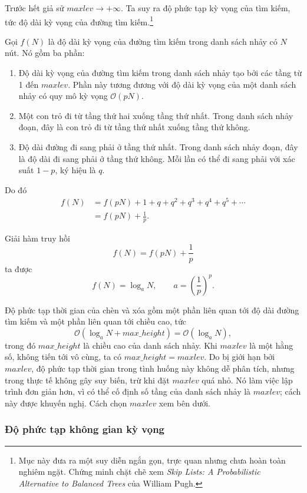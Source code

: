 \documentclass[11pt]{article}
\newcommand{\Oh}{\mathcal{O}}
\newcommand{\maxlev}{\mathit{maxlev}}
\begin{document}
Trước hết giả sử $\maxlev\to+\infty$. Ta suy ra độ phức tạp kỳ vọng của tìm
kiếm, tức độ dài kỳ vọng của đường tìm kiếm.\footnote{Mục này đưa ra một suy
diễn ngắn gọn, trực quan nhưng chưa hoàn toàn nghiêm ngặt. Chứng minh chặt chẽ
xem \textit{Skip Lists: A Probabilistic Alternative to Balanced Trees} của
William Pugh.}

Gọi $f(N)$ là độ dài kỳ vọng của đường tìm kiếm trong danh sách nhảy có $N$
nút. Nó gồm ba phần:

\begin{enumerate}
  \item Độ dài kỳ vọng của đường tìm kiếm trong danh sách nhảy tạo bởi các
  tầng từ 1 đến $\maxlev$. Phần này tương đương với độ dài kỳ vọng của một
  danh sách nhảy có quy mô kỳ vọng $\Oh(pN)$.

  \item Một con trỏ đi từ tầng thứ hai xuống tầng thứ nhất. Trong danh sách
  nhảy đoạn, đây là con trỏ đi từ tầng thứ nhất xuống tầng thứ không.

  \item Độ dài đường đi sang phải ở tầng thứ nhất. Trong danh sách nhảy đoạn,
  đây là độ dài đi sang phải ở tầng thứ không. Mỗi lần có thể đi sang phải với
  xác suất $1-p$, ký hiệu là $q$.
\end{enumerate}

Do đó
\[
\begin{aligned}
  f(N)
    &= f(pN)+1+q+q^2+q^3+q^4+q^5+\cdots\\
    &= f(pN)+\frac{1}{p}.
\end{aligned}
\]

Giải hàm truy hồi
\[
  f(N)=f(pN)+\frac{1}{p}
\]
ta được
\[
  f(N)=\log_a N,
  \qquad
  a=\left(\frac{1}{p}\right)^p.
\]

Độ phức tạp thời gian của chèn và xóa gồm một phần liên quan tới độ dài đường
tìm kiếm và một phần liên quan tới chiều cao, tức
\[
  \Oh(\log_a N+\mathit{max\_height})=\Oh(\log_a N),
\]
trong đó $\mathit{max\_height}$ là chiều cao của danh sách nhảy. Khi $\maxlev$
là một hằng số, không tiến tới vô cùng, ta có
$\mathit{max\_height}=\maxlev$. Do bị giới hạn bởi $\maxlev$, độ phức tạp thời
gian trong tình huống này không dễ phân tích, nhưng trong thực tế không gây
suy biến, trừ khi đặt $\maxlev$ quá nhỏ. Nó làm việc lập trình đơn giản hơn,
vì có thể cố định số tầng của danh sách nhảy là $\maxlev$; cách này được
khuyến nghị. Cách chọn $\maxlev$ xem bên dưới.

\subsubsection*{Độ phức tạp không gian kỳ vọng}
\end{document}
